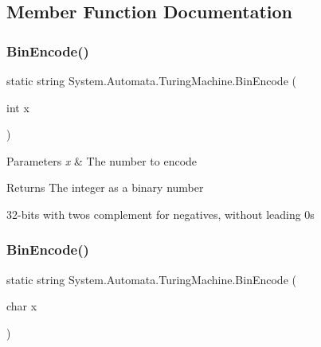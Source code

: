 \subsection{Member Function Documentation}
\mbox{\label{class_system_1_1_automata_1_1_turing_machine_a91f5ff324232a1377aa280bc7649acb5}} 
\subsubsection{\texorpdfstring{Bin\+Encode()}{BinEncode()}\hspace{0.1cm}{\footnotesize\ttfamily [1/6]}}
{\footnotesize\ttfamily static string System.\+Automata.\+Turing\+Machine.\+Bin\+Encode (\begin{DoxyParamCaption}\item[{int}]{x }\end{DoxyParamCaption})\hspace{0.3cm}{\ttfamily [static]}}


\begin{DoxyParams}{Parameters}
{\em x} & The number to encode\\
\hline
\end{DoxyParams}
\begin{DoxyReturn}{Returns}
The integer as a binary number
\end{DoxyReturn}


32-\/bits with two\textquotesingle{}s complement for negatives, without leading 0s\mbox{\label{class_system_1_1_automata_1_1_turing_machine_a256b8d185c89a85dc7c27b02e8f61684}} 
\subsubsection{\texorpdfstring{Bin\+Encode()}{BinEncode()}\hspace{0.1cm}{\footnotesize\ttfamily [2/6]}}
{\footnotesize\ttfamily static string System.\+Automata.\+Turing\+Machine.\+Bin\+Encode (\begin{DoxyParamCaption}\item[{char}]{x }\end{DoxyParamCaption})\hspace{0.3cm}{\ttfamily [static]}}


